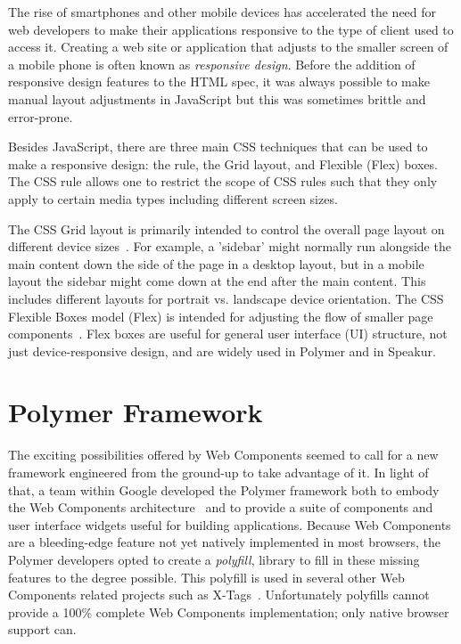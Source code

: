 The rise of smartphones and other mobile devices has accelerated the need for web developers to make their applications responsive to the type of client used to access it.
Creating a web site or application that adjusts to the smaller screen of a mobile phone is often known as \textit{responsive design}.
Before the addition of responsive design features to the HTML spec, 
it was always possible to make manual layout adjustments in JavaScript but this was sometimes brittle and error-prone.

Besides JavaScript, there are three main CSS techniques that can be used to make a responsive design: 
the  rule, 
the Grid layout, 
and Flexible (Flex) boxes.
The CSS  rule allows one to restrict the scope of CSS rules such that they only apply to certain media types including different screen sizes.

The CSS Grid layout is primarily intended to control the overall page layout on different device sizes~\cite{w3ccontributors2015-d}.
For example, a 'sidebar' might normally run alongside the main content down the side of the page in a desktop layout, but in a mobile layout the sidebar might come down at the end after the main content.
This includes different layouts for portrait vs. landscape device orientation.
The CSS Flexible Boxes model (Flex) is intended for adjusting the flow of smaller page components~\cite{mozillacontributors2015}.
Flex boxes are useful for general user interface (UI) structure, not just device-responsive design, and are widely used in Polymer and in Speakur.

\section{Polymer Framework}

The exciting possibilities offered by Web Components seemed to call for a new framework engineered from the ground-up to take advantage of it.
In light of that, a team within Google developed the 
Polymer framework both to embody the Web Components 
architecture~\cite{polymercontributors2015} and 
to provide a suite of components and user interface widgets useful for building applications.
Because Web Components are a bleeding-edge feature not yet natively implemented in most browsers,
the Polymer developers opted to create a \textit{polyfill}, 
library to fill in these missing features to the degree possible.
This polyfill is used in several other Web Components related projects such as 
X-Tags~\cite{x-tagscontributors2015}.
Unfortunately polyfills cannot provide a 100\% complete Web Components implementation; 
only native browser support can.


